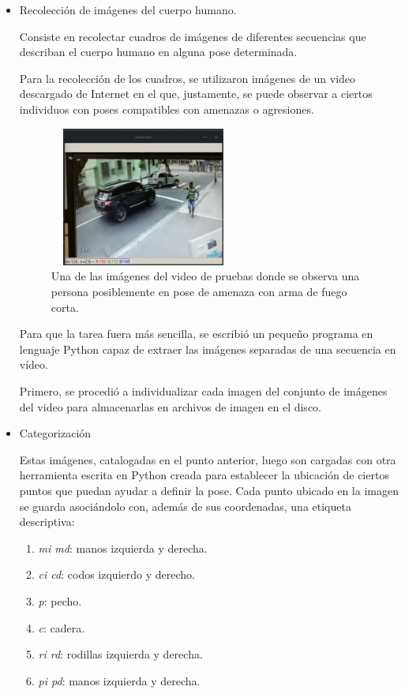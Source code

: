\documentclass[a4paper,12pt,oneside,spanish]{book}
\begin{document}
\begin{itemize}
	\item Recolección de imágenes del cuerpo humano.

	Consiste en recolectar cuadros de imágenes de diferentes secuencias que describan el cuerpo humano en alguna pose determinada.\par 
	
	Para la recolección de los cuadros, se utilizaron imágenes de un video descargado de Internet en el que, justamente, se puede observar a ciertos individuos con poses compatibles con amenazas o agresiones.\par 
	
	\begin{figure}[h!]
		\includegraphics[width=175pt,height=130pt]{Imagenes/video1.jpg}
		\centering
		\caption{Una de las imágenes del video de pruebas donde se observa una persona posiblemente en pose de amenaza con arma de fuego corta.}
		\label{fig:video1}
	\end{figure}
	
	Para que la tarea fuera más sencilla, se escribió un pequeño programa en lenguaje Python capaz de extraer las imágenes separadas de una secuencia en vídeo.\par 
	
	Primero, se procedió a individualizar cada imagen del conjunto de imágenes del video para almacenarlas en archivos de imagen en el disco.\par 

\item{Categorización}\par

	Estas imágenes, catalogadas en el punto anterior, luego son cargadas con otra herramienta escrita en Python creada para establecer la ubicación de ciertos puntos que puedan ayudar a definir la pose. Cada punto ubicado en la imagen se guarda asociándolo con, además de sus coordenadas, una etiqueta descriptiva:
	\begin{enumerate}
		\item \textit{mi md}: manos izquierda y derecha.
		\item \textit{ci cd}: codos izquierdo y derecho.
		\item \textit{p}: pecho.
		\item \textit{c}: cadera.
		\item \textit{ri rd}: rodillas izquierda y derecha.
		\item \textit{pi pd}: manos izquierda y derecha.
	\end{enumerate}	
		

\end{itemize}
\end{document}
